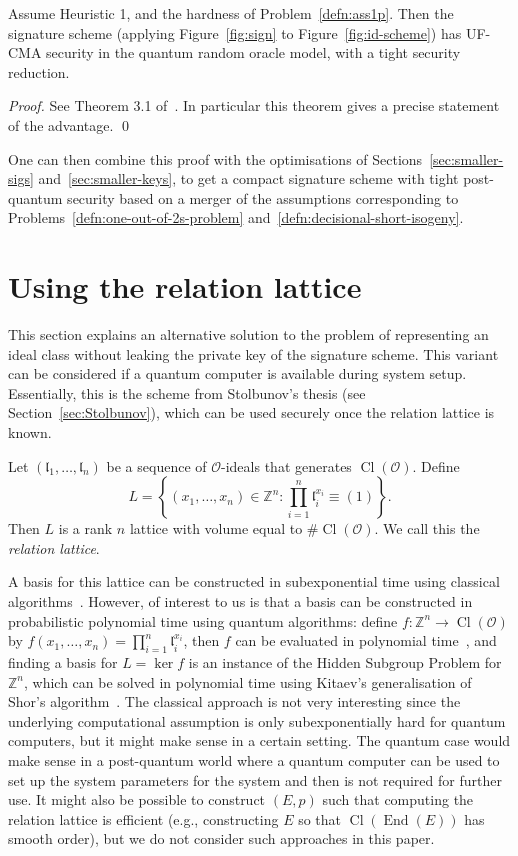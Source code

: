 \documentclass{llncs}
\newcommand{\OO}{\mathcal{O}}
\newcommand{\Z}{\mathbb{Z}}
\DeclareMathOperator{\End}{End}
\DeclareMathOperator{\Cl}{Cl}
\renewcommand{\l}{\mathfrak{l}}
\begin{document}
 

\begin{theorem}
Assume Heuristic 1,  and the hardness of Problem~\ref{defn:ass1p}.
Then the signature scheme (applying Figure~\ref{fig:sign} to Figure~\ref{fig:id-scheme}) has UF-CMA security in the quantum random oracle model, with a tight security reduction.
\end{theorem}
 

\begin{proof}
See Theorem 3.1 of~\cite{KLS18}.
In particular this theorem gives a precise statement of the advantage. \qed
\end{proof}


One can then combine this proof with the optimisations of Sections~\ref{sec:smaller-sigs} and~\ref{sec:smaller-keys}, to get a compact signature scheme with tight post-quantum security based on a merger of the assumptions corresponding to Problems~\ref{defn:one-out-of-2s-problem} and~\ref{defn:decisional-short-isogeny}.


\section{Using the relation lattice}\label{sec:sig-relation-lattice}

This section explains an alternative solution to the problem of representing an ideal class without leaking the private key of the signature scheme.
This variant can be considered if a quantum computer is available during system setup.
Essentially, this is the scheme from Stolbunov's thesis (see Section~\ref{sec:Stolbunov}), which can be used securely once the relation lattice is known.


Let $( \l_1, \dots, \l_n )$ be a sequence of $\OO$-ideals that generates $\Cl( \OO )$.
Define 
\[
   L = \left\{ (x_1, \dots, x_n ) \in \Z^n : \prod_{i=1}^n \l_i^{x_i} \equiv (1) \right\}.
\]
Then $L$ is a rank $n$ lattice with volume equal to $\#\Cl(\OO)$.
We call this the \emph{relation lattice}.

A basis for this lattice can be constructed in subexponential time using classical algorithms~\cite{hafner1989rigorous,biasse_fieker_jacobson_2016}.
However, of interest to us is that a basis can be constructed
in probabilistic polynomial time using quantum algorithms: define $f:\Z^n\to\Cl(\OO)$ by $f(x_1,\dots,x_n)=\prod_{i=1}^n\l_i^{x_i}$, then $f$ can be evaluated in polynomial time~\cite{shanks1989gauss,Cohen1993}, and finding a basis for $L=\ker f$ is an instance of the Hidden Subgroup Problem for $\Z^n$, which can be solved in polynomial time using Kitaev's generalisation of Shor's algorithm~\cite{kitaev1995hsp}.
The classical approach is not very interesting since the underlying computational assumption is only subexponentially hard for quantum computers, but it might make sense in a certain setting.
The quantum case would make sense in a post-quantum world where a quantum computer can be used to set up the system parameters for the system and then is not required for further use.
It might also be possible to construct $(E, p )$ such that computing the relation lattice is efficient (e.g., constructing $E$ so that $\Cl( \End(E))$ has smooth order), but we do not consider such approaches in this paper.
\end{document}
